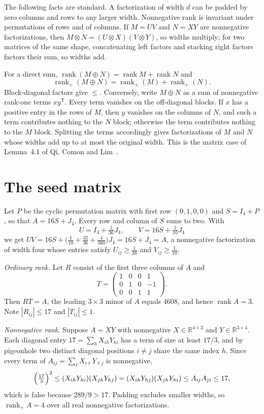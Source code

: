 \documentclass[11pt]{article}
\theoremstyle{remark}
\newcommand{\rk}{\operatorname{rank}}
\newcommand{\rp}{\operatorname{rank}_+}
\begin{document}
The following facts are standard. A factorization of width $d$ can be padded by zero columns and rows to any larger width. Nonnegative rank is invariant under permutations of rows and of columns. If $M=UV$ and $N=XY$ are nonnegative factorizations, then $M\otimes N=(U\otimes X)(V\otimes Y)$, so widths multiply; for two matrices of the same shape, concatenating left factors and stacking right factors factors their sum, so widths add.

For a direct sum, $\rk(M\oplus N)=\rk M+\rk N$ and
\begin{equation}\label{eq:directsum}
\rp(M\oplus N)=\rp(M)+\rp(N).
\end{equation}
Block-diagonal factors give $\le$. Conversely, write $M\oplus N$ as a sum of nonnegative rank-one terms $xy^{\mathsf T}$. Every term vanishes on the off-diagonal blocks. If $x$ has a positive entry in the rows of $M$, then $y$ vanishes on the columns of $N$, and such a term contributes nothing to the $N$ block; otherwise the term contributes nothing to the $M$ block. Splitting the terms accordingly gives factorizations of $M$ and $N$ whose widths add up to at most the original width. This is the matrix case of Lemma~4.1 of Qi, Comon and Lim~\cite{QCL}.

\section{The seed matrix}\label{sec:seed}

Let $P$ be the cyclic permutation matrix with first row $(0,1,0,0)$ and $S=I_4+P$, so that $A=16S+J_4$. Every row and column of $S$ sums to two. With
\[
U=I_4+\tfrac{1}{36}J_4,\qquad V=16S+\tfrac{1}{10}J_4
\]
we get $UV=16S+\bigl(\tfrac{1}{10}+\tfrac{32}{36}+\tfrac{4}{360}\bigr)J_4=16S+J_4=A$, a nonnegative factorization of width four whose entries satisfy $U_{ij}\ge\tfrac{1}{36}$ and $V_{ij}\ge\tfrac{1}{10}$.

\emph{Ordinary rank.} Let $R$ consist of the first three columns of $A$ and
\[
T=\begin{pmatrix}1&0&0&1\\0&1&0&-1\\0&0&1&1\end{pmatrix}.
\]
Then $RT=A$, the leading $3\times3$ minor of $A$ equals $4608$, and hence $\rk A=3$. Note $|R_{ij}|\le17$ and $|T_{ij}|\le1$.

\emph{Nonnegative rank.} Suppose $A=XY$ with nonnegative $X\in\mathbb{R}^{4\times3}$ and $Y\in\mathbb{R}^{3\times4}$. Each diagonal entry $17=\sum_hX_{ih}Y_{hi}$ has a term of size at least $17/3$, and by pigeonhole two distinct diagonal positions $i\ne j$ share the same index $h$. Since every term of $A_{ij}=\sum_\ell X_{i\ell}Y_{\ell j}$ is nonnegative,
\[
\Bigl(\tfrac{17}{3}\Bigr)^2\le(X_{ih}Y_{hi})(X_{jh}Y_{hj})=(X_{ih}Y_{hj})(X_{jh}Y_{hi})\le A_{ij}A_{ji}\le17,
\]
which is false because $289/9>17$. Padding excludes smaller widths, so $\rp A=4$ over all real nonnegative factorizations.
\end{document}
